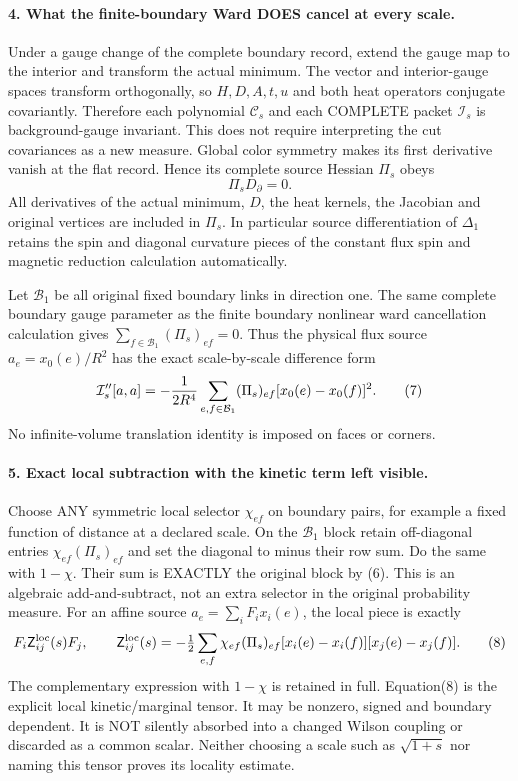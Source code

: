 \documentclass[11pt]{article}
\begin{document}
\paragraph{4. What the finite-boundary Ward DOES cancel at every scale.}
Under a gauge change of the complete boundary record, extend the gauge
map to the interior and transform the actual minimum. The vector and
interior-gauge spaces transform orthogonally, so $H,D,A,t,u$ and both heat
operators conjugate covariantly. Therefore each polynomial $\mathcal C_s$
and each COMPLETE packet $\mathcal I_s$ is background-gauge invariant.
This does not require interpreting the cut covariances as a new measure.
Global color symmetry makes its first derivative vanish at the flat
record. Hence its complete source Hessian $\Pi_s$ obeys
\[
 \Pi_s D_\partial=0.                                             \tag{6}
\]
All derivatives of the actual minimum, $D$, the heat kernels, the
Jacobian and original vertices are included in $\Pi_s$. In particular
source differentiation of $\Delta_1$ retains the spin and diagonal
curvature pieces of the constant flux spin and magnetic reduction calculation automatically.

Let $\mathcal B_1$ be all original fixed boundary links in direction one.
The same complete boundary gauge parameter as the finite boundary nonlinear ward cancellation calculation gives
$\sum_{f\in\mathcal B_1}(\Pi_s)_{ef}=0$. Thus the physical flux source
$a_e=x_0(e)/R^2$ has the exact scale-by-scale difference form
\[
 \mathcal I_s''[a,a]=-{1\over2R^4}
       \sum_{e,f\in\mathcal B_1}(\Pi_s)_{ef}[x_0(e)-x_0(f)]^2.     \tag{7}
\]
No infinite-volume translation identity is imposed on faces or corners.

\paragraph{5. Exact local subtraction with the kinetic term left visible.}
Choose ANY symmetric local selector $\chi_{ef}$ on boundary pairs, for
example a fixed function of distance at a declared scale. On the
$\mathcal B_1$ block retain off-diagonal entries
$\chi_{ef}(\Pi_s)_{ef}$ and set the diagonal to minus their row sum.
Do the same with $1-\chi$. Their sum is EXACTLY the original block by
(6). This is an algebraic add-and-subtract, not an extra selector in the
original probability measure. For an affine source
$a_e=\sum_i F_i x_i(e)$, the local piece is exactly
\[
 F_i\mathsf Z^{\rm loc}_{ij}(s)F_j,\qquad
 \mathsf Z^{\rm loc}_{ij}(s)=-\tfrac12
 \sum_{e,f}\chi_{ef}(\Pi_s)_{ef}
          [x_i(e)-x_i(f)][x_j(e)-x_j(f)].                         \tag{8}
\]
The complementary expression with $1-\chi$ is retained in full.
Equation(8) is the explicit local kinetic/marginal tensor. It may be
nonzero, signed and boundary dependent. It is NOT silently absorbed
into a changed Wilson coupling or discarded as a common scalar.
Neither choosing a scale such as $\sqrt{1+s}$ nor naming this tensor
proves its locality estimate.
\end{document}
